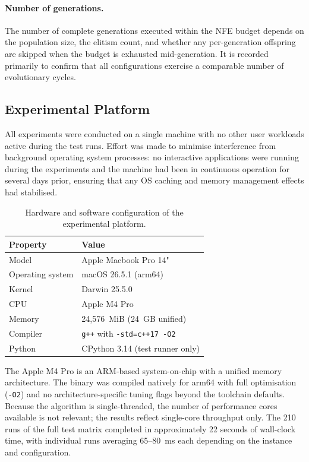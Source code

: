\documentclass[12pt]{article}
\begin{document}
\paragraph{Number of generations.}
The number of complete generations executed within the NFE budget depends on the
population size, the elitism count, and whether any per-generation offspring are
skipped when the budget is exhausted mid-generation.
It is recorded primarily to confirm that all configurations exercise a comparable
number of evolutionary cycles.

\subsection{Experimental Platform}

All experiments were conducted on a single machine with no other user workloads
active during the test runs.
Effort was made to minimise interference from background operating system
processes: no interactive applications were running during the experiments and the
machine had been in continuous operation for several days prior, ensuring that any
OS caching and memory management effects had stabilised.

\begin{table}[H]
    \centering
    \begin{tabularx}{0.75\textwidth}{|l|X|}
        \toprule
        \textbf{Property} & \textbf{Value} \\
        \midrule
        Model           & Apple Macbook Pro 14" \\
        Operating system & macOS 26.5.1 (arm64) \\
        Kernel          & Darwin 25.5.0 \\
        CPU             & Apple M4 Pro \\
        Memory          & 24{,}576~MiB (24~GB unified) \\
        Compiler        & \texttt{g++} with \texttt{-std=c++17 -O2} \\
        Python          & CPython 3.14 (test runner only) \\
        \bottomrule
    \end{tabularx}
    \caption{Hardware and software configuration of the experimental platform.}
    \label{tab:platform}
\end{table}

\noindent
The Apple M4 Pro is an ARM-based system-on-chip with a unified memory architecture.
The binary was compiled natively for arm64 with full optimisation (\texttt{-O2})
and no architecture-specific tuning flags beyond the toolchain defaults.
Because the algorithm is single-threaded, the number of performance cores available
is not relevant; the results reflect single-core throughput only.
The 210 runs of the full test matrix completed in approximately 22 seconds of
wall-clock time, with individual runs averaging 65--80~ms each depending on the
instance and configuration.
\end{document}
